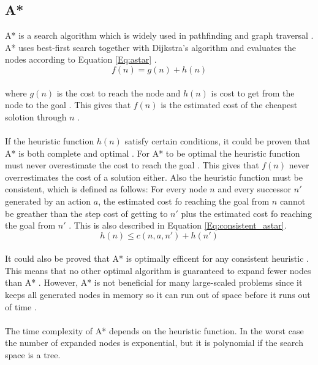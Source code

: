 \subsection{A*}
A* is a search algorithm which is widely used in pathfinding and graph traversal \citep{astar_url}. A* uses best-first search together with Dijkstra's algorithm and evaluates the nodes according to Equation \ref{Eq:astar} \citep{astar_url}. \\
\begin{equation}
f(n) = g(n) + h(n)
\label{Eq:astar}
\end{equation}\\
where $g(n)$ is the cost to reach the node and $h(n)$ is cost to get from the node to the goal \citep{astar_url}. This gives that $f(n)$ is the estimated cost of the cheapest solotion through $n$ \citep{astar_url}. 
\\\\
If the heuristic function $h(n)$ satisfy certain conditions, it could be proven that A* is both complete and optimal \citep{astar_ai}. For A* to be optimal the heuristic function must never overestimate the cost to reach the goal \citep{astar_ai}. This gives that $f(n)$ never overrestimates the cost of a solution either. Also the heuristic function must be consistent, which is defined as follows: For every node $n$ and every successor $n'$ generated by an action $a$, the estimated cost fo reaching the goal from $n$ cannot be greather than the step cost of getting to $n'$ plus the estimated cost fo reaching the goal from $n'$ \citep{astar_ai}. This is also described in Equation \ref{Eq:consistent_astar}.\\
\begin{equation}
h(n) \leq c(n, a, n') + h(n')
\label{Eq:consistent_astar}
\end{equation}\\
It could also be proved that A* is optimally efficent for any consistent heuristic \citep{astar_ai}. This means that no other optimal algorithm is guaranteed to expand fewer nodes than A* \citep{astar_ai}. However, A* is not beneficial for many large-scaled problems since it keeps all generated nodes in memory so it can run out of space before it runs out of time \citep{astar_ai}.\\\\
The time complexity of A* depends on the heuristic function. In the worst case the number of expanded nodes is exponential, but it is polynomial if the search space is a tree.
